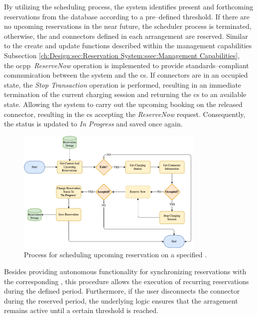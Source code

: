 By utilizing the scheduling process, the system identifies present and forthcoming reservations from the database according to a pre--defined threshold. 
If there are no upcoming reservations in the near future, the scheduler process is terminated, otherwise, the  and connectors defined in each arrangement are reserved.
Similar to the create and update functions described within the management capabilities Subsection \ref{ch:Design:sec:Reservation System:ssec:Management Capabilities}, \\ the \acrshort{ocpp}~\textit{ReserveNow} operation \cite{noauthor_ocpp_nodate} is implemented to provide standards--compliant communication between the system and the \acrshort{cs}.
If connectors are in an occupied state, the \textit{Stop Transaction} operation is performed, resulting in an immediate termination of the current charging session and returning the \acrshort{cs} to an available state.
Allowing the system to carry out the upcoming booking on the released connector, resulting in the \acrshort{cs} accepting the \textit{ReserveNow} request.
Consequently, the status is updated to \textit{In Progress} and saved once again.

\begin{figure}[h]
    \centering
    \includegraphics[width=0.8\textwidth,keepaspectratio]{resources/images/main/5_design/processes/scheduler/SynchronizeReservation.png}
    \caption{Process for scheduling upcoming reservation on a specified .}
    \label{fig:schedule-reservation-flowchart}
\end{figure}

\noindent Besides providing autonomous functionality for synchronizing reservations with the corresponding , this procedure allows the execution of recurring reservations during the defined period. 
Furthermore, if the user disconnects the connector during the reserved period, the underlying logic ensures that the arragement remains active until a certain threshold is reached.

